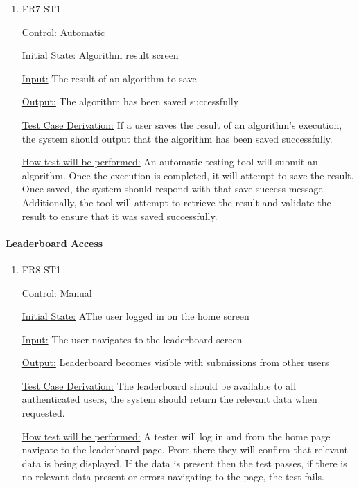 \documentclass[12pt, titlepage]{article}
\begin{document}
\begin{enumerate}

\item{FR7-ST1\\}

\underline{Control:} Automatic

\underline{Initial State:} Algorithm result screen

\underline{Input:} The result of an algorithm to save

\underline{Output:} The algorithm has been saved successfully

\underline{Test Case Derivation:} If a user saves the result of an algorithm's execution, the system should output that the algorithm has been saved successfully.

\underline{How test will be performed:} An automatic testing tool will submit an algorithm. Once the execution is completed, it will attempt to save the result. Once saved, the system should respond with that save success message. Additionally, the tool will attempt to retrieve the result and validate the result to ensure that it was saved successfully.

\end{enumerate}

\paragraph{Leaderboard Access}

\begin{enumerate}

\item{FR8-ST1\\}

\underline{Control:} Manual

\underline{Initial State:} AThe user logged in on the home screen

\underline{Input:} The user navigates to the leaderboard screen

\underline{Output:} Leaderboard becomes visible with submissions from other users

\underline{Test Case Derivation:} The leaderboard should be available to all authenticated users, the system should return the relevant data when requested.

\underline{How test will be performed:} A tester will log in and from the home page navigate to the leaderboard page. From there they will confirm that relevant data is being displayed. If the data is present then the test passes, if there is no relevant data present or errors navigating to the page, the test fails.

\end{enumerate}
\end{document}
